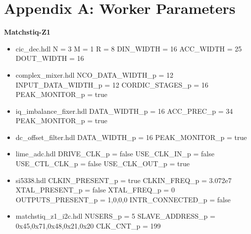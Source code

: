\documentclass{article}
\begin{document}
\section{Appendix A: Worker Parameters}
\begin{minipage}[t]{.5\textwidth}
	\textbf{Matchstiq-Z1}
	\begin{itemize}
		\item cic\_dec.hdl
			\subitem N = 3
			\subitem M = 1
			\subitem R = 8
			\subitem DIN\_WIDTH = 16
			\subitem ACC\_WIDTH = 25
			\subitem DOUT\_WIDTH = 16
		\item complex\_mixer.hdl
			\subitem NCO\_DATA\_WIDTH\_p = 12
			\subitem INPUT\_DATA\_WIDTH\_p = 12
			\subitem CORDIC\_STAGES\_p = 16
			\subitem PEAK\_MONITOR\_p = true
		\item iq\_imbalance\_fixer.hdl
			\subitem DATA\_WIDTH\_p = 16
			\subitem ACC\_PREC\_p = 34
			\subitem PEAK\_MONITOR\_p = true
		\item dc\_offset\_filter.hdl
			\subitem DATA\_WIDTH\_p = 16
			\subitem PEAK\_MONITOR\_p = true
		\item lime\_adc.hdl
			\subitem DRIVE\_CLK\_p = false
			\subitem USE\_CLK\_IN\_p = false
			\subitem USE\_CTL\_CLK\_p = false
			\subitem USE\_CLK\_OUT\_p = true
		\item si5338.hdl
			\subitem CLKIN\_PRESENT\_p = true
			\subitem CLKIN\_FREQ\_p = 3.072e7
			\subitem XTAL\_PRESENT\_p = false
			\subitem XTAL\_FREQ\_p = 0
			\subitem OUTPUTS\_PRESENT\_p = 1,0,0,0
			\subitem INTR\_CONNECTED\_p = false
		\item matchstiq\_z1\_i2c.hdl
			\subitem NUSERS\_p = 5
			\subitem SLAVE\_ADDRESS\_p = 0x45,0x71,0x48,0x21,0x20
			\subitem CLK\_CNT\_p = 199
	\end{itemize}
\end{minipage}
\end{document}
